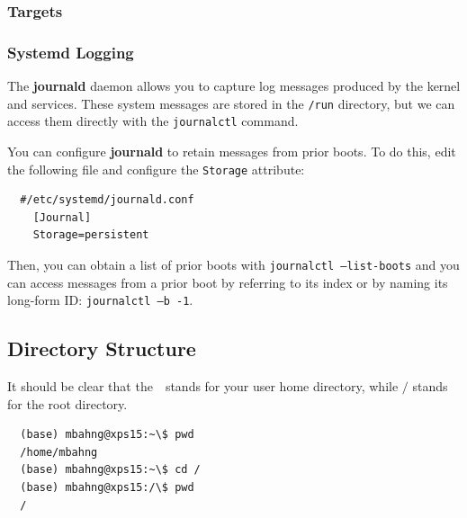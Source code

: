 \subsubsection{Targets}

\subsubsection{Systemd Logging}

  The \textbf{journald} daemon allows you to capture log messages produced by the kernel and services. These system messages are stored in the \texttt{/run} directory, but we can access them directly with the \texttt{journalctl}  command. 

  \begin{example}
    \label{ex:systemd-logging}
    
  \end{example}

  You can configure \textbf{journald} to retain messages from prior boots. To do this, edit the following file and configure the \texttt{Storage} attribute: 
  \begin{lstlisting}
  #/etc/systemd/journald.conf
    [Journal]
    Storage=persistent
  \end{lstlisting}

  Then, you can obtain a list of prior boots with \texttt{journalctl --list-boots} and you can access messages from a prior boot by referring to its index or by naming its long-form ID: \texttt{journalctl --b -1}. 

\subsection{Directory Structure} 

  It should be clear that the $\texttt{~}$ stands for your user home directory, while $\texttt{/}$ stands for the root directory. 
  \begin{lstlisting}
  (base) mbahng@xps15:~\$ pwd
  /home/mbahng
  (base) mbahng@xps15:~\$ cd /
  (base) mbahng@xps15:/\$ pwd
  /
  \end{lstlisting}

